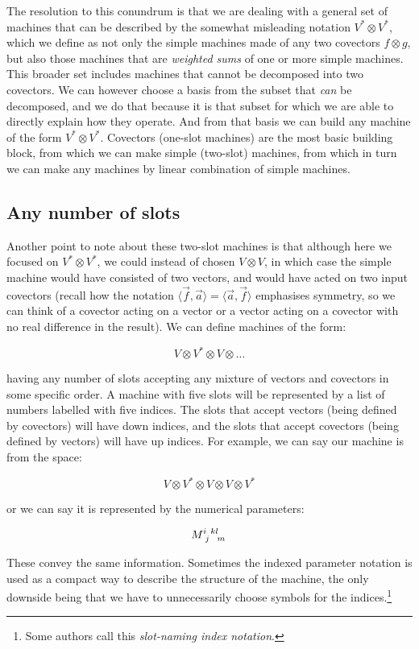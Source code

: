 The resolution to this conundrum is that we are dealing with a general set of machines that can be described by the somewhat misleading notation $V^* \otimes V^*$, which we define as not only the simple machines made of any two covectors $f \otimes g$, but also those machines that are \textit{weighted sums} of one or more simple machines. This broader set includes machines that cannot be decomposed into two covectors. We can however choose a basis from the subset that \textit{can} be decomposed, and we do that because it is that subset for which we are able to directly explain how they operate. And from that basis we can build any machine of the form $V^* \otimes V^*$. Covectors (one-slot machines) are the most basic building block, from which we can make simple (two-slot) machines, from which in turn we can make any machines by linear combination of simple machines.

\subsection{Any number of slots}

Another point to note about these two-slot machines is that although here we focused on $V^* \otimes V^*$, we could instead of chosen $V \otimes V$, in which case the simple machine would have consisted of two vectors, and would have acted on two input covectors (recall how the notation $\langle \vec{f}, \vec{a} \rangle = \langle \vec{a}, \vec{f} \rangle$ emphasises symmetry, so we can think of a covector acting on a vector or a vector acting on a covector with no real difference in the result). We can define machines of the form: 

$$
V \otimes V^* \otimes V \otimes \ldots
$$ 

having any number of slots accepting any mixture of vectors and covectors in some specific order. A machine with five slots will be represented by a list of numbers labelled with five indices. The slots that accept vectors (being defined by covectors) will have down indices, and the slots that accept covectors (being defined by vectors) will have up indices. For example, we can say our machine is from the space:

$$
V \otimes V^* \otimes V \otimes V \otimes V^*
$$ 

or we can say it is represented by the numerical parameters:

$$
M\indices{^i_j^k^l_m}
$$

These convey the same information. Sometimes the indexed parameter notation is used as a compact way to describe the structure of the machine, the only downside being that we have to unnecessarily choose symbols for the indices.\footnote{Some authors call this \textit{slot-naming index notation}.}

